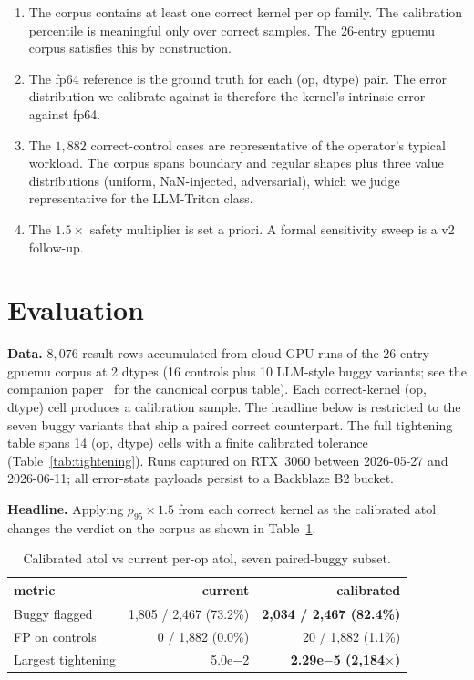 \documentclass[runningheads]{llncs}
\begin{document}
\begin{enumerate}
\item The corpus contains at least one correct kernel per op family.
The calibration percentile is meaningful only over correct samples.
The 26-entry gpuemu corpus satisfies this by construction.
\item The fp64 reference is the ground truth for each (op, dtype) pair.
The error distribution we calibrate against is therefore the kernel's
intrinsic error against fp64.
\item The $1{,}882$ correct-control cases are representative of the
operator's typical workload. The corpus spans boundary and regular
shapes plus three value distributions (uniform, NaN-injected,
adversarial), which we judge representative for the LLM-Triton class.
\item The $1.5\times$ safety multiplier is set a priori. A formal
sensitivity sweep is a v2 follow-up.
\end{enumerate}

\section{Evaluation}
\label{sec:eval}

\textbf{Data.} $8{,}076$ result rows accumulated from cloud GPU runs
of the 26-entry gpuemu corpus at 2 dtypes (16 controls plus 10
LLM-style buggy variants; see the companion paper~\cite{gpuemuP1}
for the canonical corpus table). Each correct-kernel (op, dtype)
cell produces a calibration sample. The headline below is restricted
to the seven buggy variants that ship a paired correct counterpart.
The full tightening table spans 14 (op, dtype) cells with a finite
calibrated tolerance (Table~\ref{tab:tightening}). Runs captured on
RTX~3060 between 2026-05-27 and 2026-06-11; all error-stats payloads
persist to a Backblaze B2 bucket.

\textbf{Headline.} Applying $p_{95} \times 1.5$ from each correct
kernel as the calibrated atol changes the verdict on the corpus as
shown in Table~\ref{tab:headline}.

\begin{table}[h]
\centering
\caption{Calibrated atol vs current per-op atol, seven paired-buggy
subset.}
\label{tab:headline}
\begin{tabular}{lrr}
\toprule
metric & current & \textbf{calibrated} \\
\midrule
Buggy flagged              & 1{,}805 / 2{,}467 (73.2\%) & \textbf{2{,}034 / 2{,}467 (82.4\%)} \\
FP on controls             & 0 / 1{,}882 (0.0\%)        & 20 / 1{,}882 (1.1\%) \\
Largest tightening         & 5.0e$-$2                   & \textbf{2.29e$-$5 (2{,}184$\times$)} \\
\bottomrule
\end{tabular}
\end{table}
\end{document}
